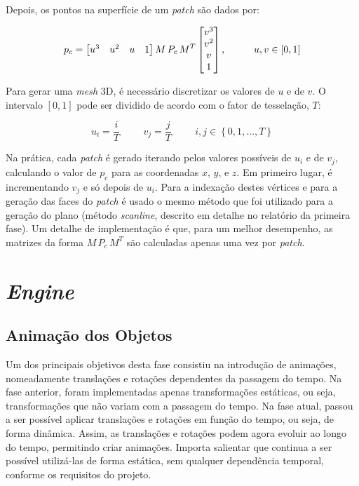 \documentclass[12pt, a4paper]{article}
\begin{document}
Depois, os pontos na superfície de um \emph{patch} são dados por:

$$
\def\arraystretch{1}
p_c =
\begin{bmatrix}
    u^3 & u^2 & u & 1
\end{bmatrix}
M \, P_c \, M^T
\begin{bmatrix}
    v^3 \\ v^2 \\ v \\ 1
\end{bmatrix},
\hspace{1cm}
u, v \in \left [ 0, 1 \right ]
$$

Para gerar uma \emph{mesh} 3D, é necessário discretizar os valores de $u$ e de $v$. O intervalo
$\left [ 0, 1 \right ]$ pode ser dividido de acordo com o fator de tesselação, $T$:

$$
u_i = \frac{i}{T}
\hspace{1cm}
v_j = \frac{j}{T}
\hspace{1cm}
i, j \in \left \lbrace 0, 1, \ldots, T \right \rbrace
$$

Na prática, cada \emph{patch} é gerado iterando pelos valores possíveis de $u_i$ e de $v_j$,
calculando o valor de $p_c$ para as coordenadas $x$, $y$, e $z$. Em primeiro lugar, é incrementando
$v_j$ e só depois de $u_i$. Para a indexação destes vértices e para a geração das faces do
\emph{patch} é usado o mesmo método que foi utilizado para a geração do plano (método
\emph{scanline}, descrito em detalhe no relatório da primeira fase). Um detalhe de implementação é
que, para um melhor desempenho, as matrizes da forma $M \, P_c \, M^T$ são calculadas apenas uma vez
por \emph{patch}.

\section{\emph{Engine}}

\subsection{Animação dos Objetos}

Um dos principais objetivos desta fase consistiu na introdução de animações, nomeadamente
translações e rotações dependentes da passagem do tempo. Na fase anterior, foram implementadas
apenas transformações estáticas, ou seja, transformações que não variam com a passagem do tempo.
Na fase atual, passou a ser possível aplicar translações e rotações em função do tempo,
ou seja, de forma dinâmica. Assim, as translações e rotações podem agora evoluir ao longo do tempo,
permitindo criar animações. Importa salientar que continua a ser possível utilizá-las de forma
estática, sem qualquer dependência temporal, conforme os requisitos do projeto.
\end{document}
